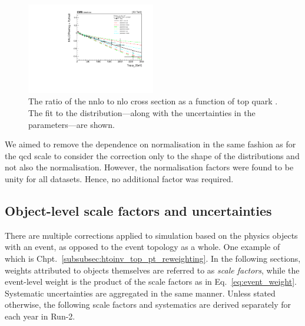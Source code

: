 \begin{figure}[htbp]
    \centering
    \includegraphics[width=0.5\textwidth]{figures/top_pt_reweighting/top_pt_reweighting_central.pdf}
    \caption[The ratio of the NNLO to NLO \ttbar cross section as a function of top quark \pt. The fit to the distribution---along with the uncertainties in the parameters---are shown]{The ratio of the \acrshort{nnlo} to \acrshort{nlo} \ttbar cross section as a function of top quark \pt. The fit to the distribution---along with the uncertainties in the parameters---are shown.}
    \label{fig:top_pt_reweighting}
\end{figure}

We aimed to remove the dependence on normalisation in the same fashion as for the \acrshort{qcd} scale to consider the correction only to the shape of the distributions and not also the normalisation. However, the normalisation factors were found to be unity for all datasets. Hence, no additional factor was required.





\subsection{Object-level scale factors and uncertainties}
\label{subsec:htoinv_SFs_systs_objects}

There are multiple corrections applied to simulation based on the physics objects with an event, as opposed to the event topology as a whole. One example of which is Chpt.~\ref{subsubsec:htoinv_top_pt_reweighting}. In the following sections, weights attributed to objects themselves are referred to as \emph{scale factors}, while the event-level weight is the product of the scale factors as in Eq.~\ref{eq:event_weight}. Systematic uncertainties are aggregated in the same manner. Unless stated otherwise, the following scale factors and systematics are derived separately for each year in Run-2.


